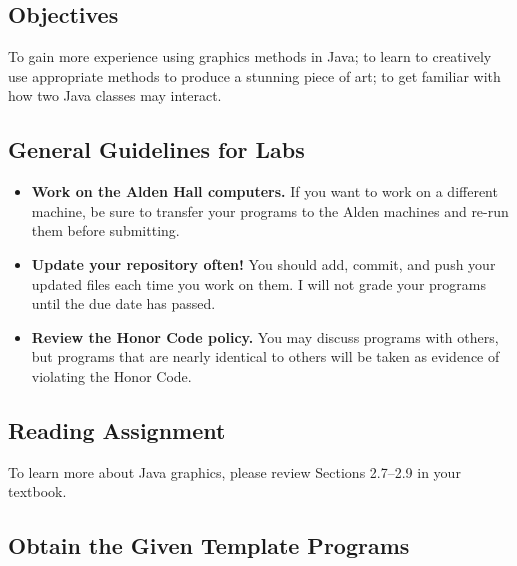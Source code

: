 



\subsection*{Objectives}
\vspace{-0.05in}

To gain more experience using graphics methods in Java; to learn to creatively use appropriate methods to produce a
stunning piece of art; to get familiar with how two Java classes may interact. 

\subsection*{General Guidelines for Labs}
\vspace{-0.05in}
\begin{itemize}
\item
{\bf Work on the Alden Hall computers.} If you want to work on a different
machine, be sure to transfer your programs to the Alden
machines and re-run them before submitting.
\item
{\bf Update your repository often!} You should add, commit, 
and push your updated files each time you work on them.  I will not grade 
your programs until the due date has passed.
\item
{\bf Review the Honor Code policy.} You
may discuss programs with others, but programs that are nearly identical
to others will be taken as evidence of violating the Honor Code.
\end{itemize}

\subsection*{Reading Assignment}
\vspace{-0.05in}
To learn more about Java graphics, please review Sections 2.7--2.9 in your textbook. 

\subsection*{Obtain the Given Template Programs}
\vspace{-0.05in}

